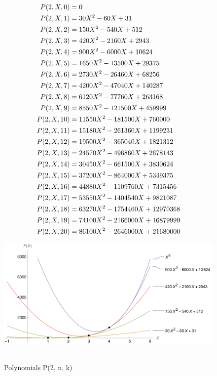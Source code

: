 ﻿\begin{align*}
    {P}(2,X,0) &= 0 \\
    {P}(2,X,1) &= 30X^2 - 60X + 31 \\
    {P}(2,X,2) &= 150X^2 - 540X + 512 \\
    {P}(2,X,3) &= 420X^2 - 2160X + 2943 \\
    {P}(2,X,4) &= 900X^2 - 6000X + 10624 \\
    {P}(2,X,5) &= 1650X^2 - 13500X + 29375 \\
    {P}(2,X,6) &= 2730X^2 - 26460X + 68256 \\
    {P}(2,X,7) &= 4200X^2 - 47040X + 140287 \\
    {P}(2,X,8) &= 6120X^2 - 77760X + 263168 \\
    {P}(2,X,9) &= 8550X^2 - 121500X + 459999 \\
    {P}(2,X,10) &= 11550X^2 - 181500X + 760000 \\
    {P}(2,X,11) &= 15180X^2 - 261360X + 1199231 \\
    {P}(2,X,12) &= 19500X^2 - 365040X + 1821312 \\
    {P}(2,X,13) &= 24570X^2 - 496860X + 2678143 \\
    {P}(2,X,14) &= 30450X^2 - 661500X + 3830624 \\
    {P}(2,X,15) &= 37200X^2 - 864000X + 5349375 \\
    {P}(2,X,16) &= 44880X^2 - 1109760X + 7315456 \\
    {P}(2,X,17) &= 53550X^2 - 1404540X + 9821087 \\
    {P}(2,X,18) &= 63270X^2 - 1754460X + 12970368 \\
    {P}(2,X,19) &= 74100X^2 - 2166000X + 16879999 \\
    {P}(2,X,20) &= 86100X^2 - 2646000X + 21680000
\end{align*}
\begin{figure}[H]
    \centering
    \includegraphics[width=1\textwidth]{sections/images/03_fifth_power_with_p_1_n_k}
    ~\caption{Polynomials P(2, n, k)}\label{fig:figure3}
\end{figure}
